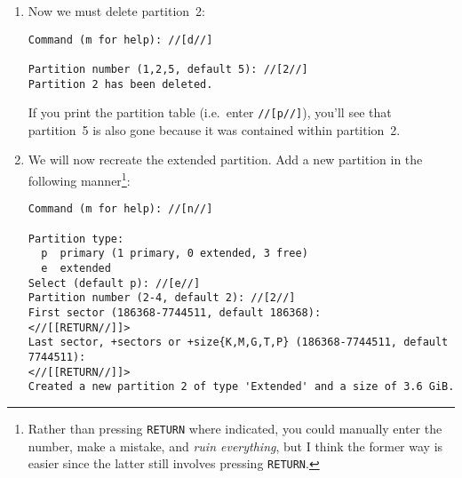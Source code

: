 \documentclass[12pt,letterpaper]{article}
\newcommand\kbd[1]{\textlangle\texttt{#1}\textrangle}
\newcommand\return{RETURN}
\begin{document}
\begin{enumerate}
The first partition is the boot partition.  The second is an extended partition used to overcome the 4~primary partition limit.  The third partition---that is, partition~5---is contained within partition~2, and holds only \SI{849.5}{\mebi\byte}\footnote{%
%
Note the distinction between \si{\mebi\byte} (1~mebibyte \(=1024\cdot1024\) bytes) and \si{\mega\byte} (1 megabyte \(=10^6\) bytes).  I've tried to be consistent in this document, but mistakes have a way of creeping in, and it's ultimately not terribly important.}, which is only a fraction of the disk's available space.

\item Now we must delete partition~2:
\begin{lstlisting}
Command (m for help): //[d//]

Partition number (1,2,5, default 5): //[2//]
Partition 2 has been deleted.
\end{lstlisting}

If you print the partition table (i.e.\ enter \lstinline{//[p//]}), you'll see that partition~5 is also gone because it was contained within partition~2.

\item We will now recreate the extended partition.  Add a new partition in the following manner\footnote{Rather than pressing \kbd{\return} where indicated, you could manually enter the number, make a mistake, and \emph{ruin everything}, but I think the former way is easier since the latter still involves pressing \kbd{\return}.}:

\begin{lstlisting}
Command (m for help): //[n//]

Partition type:
  p  primary (1 primary, 0 extended, 3 free)
  e  extended
Select (default p): //[e//]
Partition number (2-4, default 2): //[2//]
First sector (186368-7744511, default 186368):
<//[[RETURN//]]>
Last sector, +sectors or +size{K,M,G,T,P} (186368-7744511, default 7744511):
<//[[RETURN//]]>
Created a new partition 2 of type 'Extended' and a size of 3.6 GiB.
\end{lstlisting}


\end{enumerate}
\end{document}
